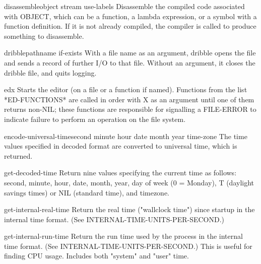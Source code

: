 \documentclass[10pt,english]{book}
\begin{document}
\begin{function}{disassemble}{object \key stream use-labels}
  Disassemble the compiled code associated with OBJECT, which can be a
  function, a lambda expression, or a symbol with a function definition. If
  it is not already compiled, the compiler is called to produce something to
  disassemble.
\end{function}

\begin{function}{dribble}{\op pathname \key if-exists}
  With a file name as an argument, dribble opens the file and sends a
  record of further I/O to that file. Without an argument, it closes
  the dribble file, and quits logging.
\end{function}

\begin{function}{ed}{\op x}
  Starts the editor (on a file or a function if named).  Functions
from the list *ED-FUNCTIONS* are called in order with X as an argument
until one of them returns non-NIL; these functions are responsible for
signalling a FILE-ERROR to indicate failure to perform an operation on
the file system.
\end{function}

\begin{function}{encode-universal-time}{second minute hour date month year \op time-zone}
  The time values specified in decoded format are converted to
   universal time, which is returned.
\end{function}

\begin{function}{get-decoded-time}{}
  Return nine values specifying the current time as follows:
   second, minute, hour, date, month, year, day of week (0 = Monday), T
   (daylight savings times) or NIL (standard time), and timezone.
\end{function}

\begin{function}{get-internal-real-time}{}
  Return the real time ("wallclock time") since startup in the internal
time format. (See INTERNAL-TIME-UNITS-PER-SECOND.)
\end{function}

\begin{function}{get-internal-run-time}{}
  Return the run time used by the process in the internal time format. (See
INTERNAL-TIME-UNITS-PER-SECOND.) This is useful for finding CPU usage.
Includes both "system" and "user" time.
\end{function}
\end{document}
